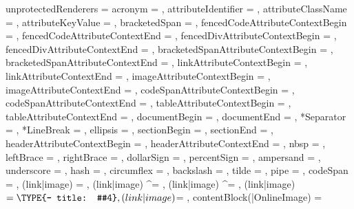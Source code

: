 unprotectedRenderers = {%
  acronym = {%
    },
  attributeIdentifier = {%
    },
  attributeClassName = {%
    },
  attributeKeyValue = {%
    },
  bracketedSpan = {%
    },
  fencedCodeAttributeContextBegin = {%
    },
  fencedCodeAttributeContextEnd = {%
    },
  fencedDivAttributeContextBegin = {%
    },
  fencedDivAttributeContextEnd = {%
    },
  bracketedSpanAttributeContextBegin = {%
    },
  bracketedSpanAttributeContextEnd = {%
    },
  linkAttributeContextBegin = {%
    },
  linkAttributeContextEnd = {%
    },
  imageAttributeContextBegin = {%
    },
  imageAttributeContextEnd = {%
    },
  codeSpanAttributeContextBegin = {%
    },
  codeSpanAttributeContextEnd = {%
    },
  tableAttributeContextBegin = {%
    },
  tableAttributeContextEnd = {%
    },
  documentBegin = {%
    },
  documentEnd = {%
    },
  *Separator = {%
    },
  *LineBreak = {%
    },
  ellipsis = {%
    },
  sectionBegin = {%
    },
  sectionEnd = {%
    },
  headerAttributeContextBegin = {%
    },
  headerAttributeContextEnd = {%
    },
  nbsp = {%
    },
  leftBrace = {%
    },
  rightBrace = {%
    },
  dollarSign = {%
    },
  percentSign = {%
    },
  ampersand = {%
    },
  underscore = {%
    },
  hash = {%
    },
  circumflex = {%
    },
  backslash = {%
    },
  tilde = {%
    },
  pipe = {%
    },
  codeSpan = {%
    },
  (link|image) = {%
    },
  (link|image) ^= {%
    },
  (link|image) ^= {%
    },
  (link|image) $= {%
    \TYPE{- title:  #4}},
  (link|image) $= {%
    },
  contentBlock(|OnlineImage) = {%
}}
